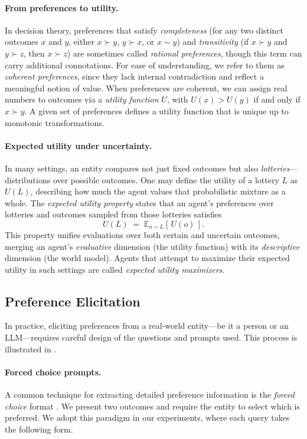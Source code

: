 \paragraph{From preferences to utility.}
In decision theory, preferences that satisfy \emph{completeness} (for any two distinct outcomes \(x\) and \(y\), either \(x \succ y\), \(y \succ x\), or \(x \sim y\)) and \emph{transitivity} (if \(x \succ y\) and \(y \succ z\), then \(x \succ z\)) are sometimes called \emph{rational preferences}, though this term can carry additional connotations. For ease of understanding, we refer to them as \emph{coherent preferences}, since they lack internal contradiction and reflect a meaningful notion of value. When preferences are coherent, we can assign real numbers to outcomes via a \emph{utility function} \(U\), with \(U(x) > U(y)\) if and only if \(x \succ y\). A given set of preferences defines a utility function that is unique up to monotonic transformations.

\paragraph{Expected utility under uncertainty.}
In many settings, an entity compares not just fixed outcomes but also \emph{lotteries}—distributions over possible outcomes. One may define the utility of a lottery \(L\) as \(U(L)\), describing how much the agent values that probabilistic mixture as a whole. The \emph{expected utility property} states that an agent’s preferences over lotteries and outcomes sampled from those lotteries satisfies
\[
U(L) \;=\; \mathbb{E}_{o \sim L}[\,U(o)\,].
\]
This property unifies evaluations over both certain and uncertain outcomes, merging an agent’s \emph{evaluative} dimension (the utility function) with its \emph{descriptive} dimension (the world model). Agents that attempt to maximize their expected utility in such settings are called \emph{expected utility maximizers}.

\subsection{Preference Elicitation}
\label{sec:pref_elicitation}
In practice, eliciting preferences from a real-world entity—be it a person or an LLM—requires careful design of the questions and prompts used. This process is illustrated in .

\paragraph{Forced choice prompts.}
A common technique for extracting detailed preference information is the \emph{forced choice} format \citep{guth1982experimental,falk2003nature}. We present two outcomes and require the entity to select which is preferred. We adopt this paradigm in our experiments, where each query takes the following form.

